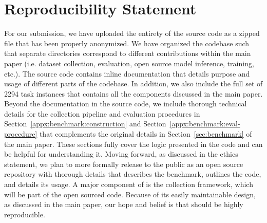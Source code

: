\section{Reproducibility Statement}
\label{sec:reproducibility-statement}
For our submission, we have uploaded the entirety of the source code as a zipped file that has been properly anonymized.
We have organized the codebase such that separate directories correspond to different contributions within the main paper (i.e. dataset collection, evaluation, open source model inference, \swellama{} training, etc.).
The source code contains inline documentation that details purpose and usage of different parts of the codebase.
In addition, we also include the full set of 2294 \benchmark{} task instances that contains all the components discussed in the main paper.
Beyond the documentation in the source code, we include thorough technical details for the collection pipeline and evaluation procedures in Section~\ref{appx:benchmark:construction} and Section~\ref{appx:benchmark:eval-procedure} that complements the original details in Section~\ref{sec:benchmark} of the main paper.
These sections fully cover the logic presented in the code and can be helpful for understanding it.
Moving forward, as discussed in the ethics statement, we plan to more formally release \benchmark{} to the public as an open source repository with thorough details that describes the benchmark, outlines the code, and details its usage.
A major component of \benchmark{} is the collection framework, which will be part of the open sourced code.
Because of its easily maintainable design, as discussed in the main paper, our hope and belief is that \benchmark{} should be highly reproducible.
